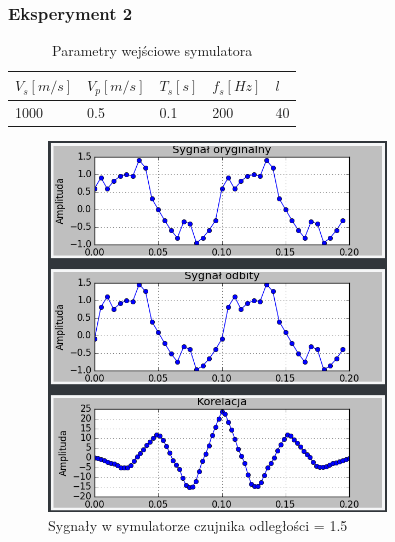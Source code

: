 \documentclass{article}
\begin{document}
{        \subsubsection{Eksperyment 2} {
            \begin{table}[h!]
                \centering
                \begin{tabular}{|l|l|l|l|l|}
                    \hline
                    $V_s[m/s]$ & $V_p[m/s]$ & $T_s[s]$ & $f_s[Hz]$ & $l$ \\ \hline
                    1000       & 0.5        & 0.1      & 200       & 40 \\ \hline
                \end{tabular}
                \caption{Parametry wejściowe symulatora}
            \end{table}
            \begin{figure}[h!]
                \centering
                \includegraphics[width=0.8\textwidth]{img/sim5.png}
                \caption{Sygnały w symulatorze czujnika odległości = 1.5}
            \end{figure}
            \begin{figure}[h!]
                \centering

\end{figure}}}
\end{document}
